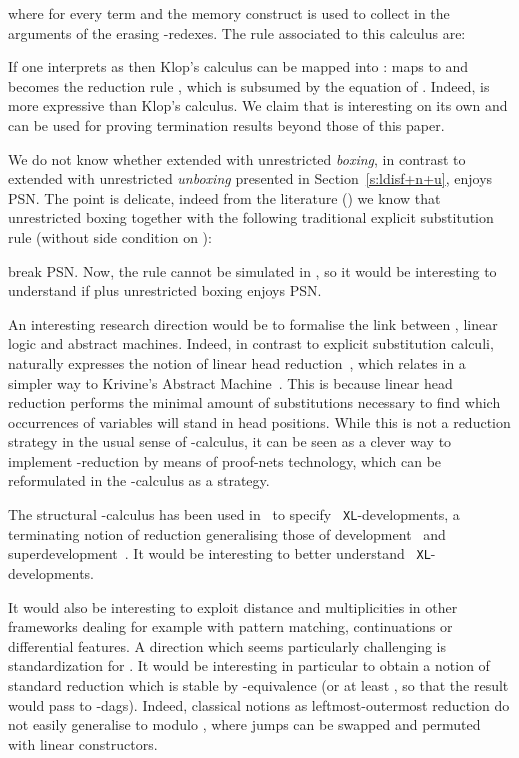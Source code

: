 \documentclass{LMCS}
\renewcommand{\>}{\rightarrow}
\begin{document}
where  for every term  and the memory construct  
is used to collect in  the  arguments of the erasing -redexes. The rule associated to this calculus are:

If       one      interprets              as         then   Klop's
calculus  can be  mapped into  :   maps to   and
         becomes        the         reduction        rule
,  which is  subsumed  by
the equation  of . 
Indeed,  
is more expressive than  Klop's calculus.  We
claim that   is  interesting on  its own and  can be  used for
proving termination results beyond those of this paper.

We do not know whether 
   extended with unrestricted \textit{boxing}, in contrast to
     extended with unrestricted \textit{unboxing} presented in 
  Section~\ref{s:ldisf+n+u}, enjoys PSN.  The
  point is delicate, indeed from the literature (\cite{Mellies1995a}) we know
  that unrestricted boxing together with the following
  traditional explicit substitution rule (without side condition on
  ):


\noindent break PSN. Now, the rule  cannot be simulated in
, so it would be interesting to
 understand if  plus unrestricted boxing
enjoys PSN. 

An  interesting research  direction  would be  to  formalise the  link
between  ,  linear  logic  and abstract  machines.  Indeed,  in
contrast  to  explicit substitution  calculi,  
naturally     expresses     the      notion     of     linear     head
reduction~\cite{Danos99opt},  which  relates   in  a  simpler  way  to
Krivine's  Abstract  Machine~\cite{Krivinemachine}. This
is  because  linear head  reduction  performs  the  minimal amount  of
substitutions necessary  to find  which occurrences of  variables will
stand in head positions. While this is not a reduction strategy in the
usual  sense of  -calculus, it  can  be seen  as a  clever way  to
implement -reduction  by means of  proof-nets technology, which
can be reformulated in the -calculus as a strategy.


The  structural -calculus  has   been  used in~\cite{AK10}  to  specify  {\tt
  XL}-developments,  a terminating  notion  of reduction  generalising
those           of           development~\cite{Hindley78}          and
superdevelopment~\cite{KvOvR93}. It would be interesting to better understand {\tt
  XL}-developments.

It would also be interesting to exploit distance and multiplicities in
other frameworks dealing  for example with pattern matching,
continuations  or  differential  features.   A direction  which  seems
particularly  challenging is standardization
for . It  would be interesting  in particular to obtain  a
notion    of     standard    reduction   which     is    stable    by
-equivalence (or  at least  , so that  the result
would    pass   to   -dags).   Indeed,
classical  notions as leftmost-outermost  reduction do
not  easily generalise  to   modulo , where  jumps can  be
swapped and permuted with linear constructors.
\end{document}
